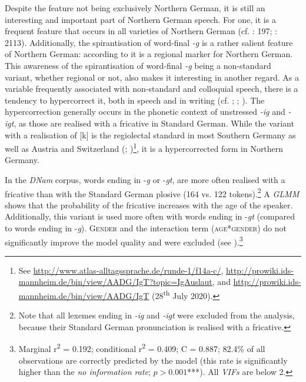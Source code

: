 \documentclass[output=paper]{langsci/langscibook}
\begin{document}
Despite the feature not being exclusively Northern German, it is still an interesting and important part of Northern German speech. For one, it is a frequent feature that occurs in all varieties of Northern German (cf. \citealt{lauf_regional_1996}: 197; \citealt{mihm_sprachgeschichte_2000}: 2113). Additionally, the spirantisation of word-final \textit{-g} is a rather salient feature of Northern German: according to \citet[159]{berend_standard_2008} it is a regional marker for Northern German. This awareness of the spirantisation of word-final \textit{-g} being a non-standard variant, whether regional or not, also makes it interesting in another regard. As a variable frequently associated with non-standard and colloquial speech, there is a tendency to hypercorrect it, both in speech and in writing (cf. \citealt{rosenberg_berliner_1986}; \citealt{martens_niederdeutsch-bedingte_1988}; \citealt{eichinger_deutsche_2007}). The hypercorrection generally occurs in the phonetic context of unstressed \textit{-ig} and \textit{-igt}, as those are realised with a fricative in Standard German. While the variant with a realisation of [k] is the regiolectal standard in most Southern Germany as well as Austria and Switzerland (\citealt{elspas_atlas_2003}; \citealt{kleiner_atlas_2011})\footnote{See \url{http://www.atlas-alltagssprache.de/runde-1/f14a-c/}, \url{http://prowiki.ids-mannheim.de/bin/view/AADG/IgT?topic=IgAuslaut}, and \url{http://prowiki.ids-mannheim.de/bin/view/AADG/IgT} (28\textsuperscript{th} July 2020).}, it is a hypercorrected form in Northern Germany. 

In the \textit{DNam} corpus, words ending in \nobreakdash-\textit{g} or -\textit{gt}, are more often realised with a fricative than with the Standard German plosive (164 vs. 122 tokens).\footnote{Note that all lexemes ending in \textit{-ig} and \textit{-igt} were excluded from the analysis, because their Standard German pronunciation is realised with a fricative.} A \textit{GLMM} shows that the probability of the fricative increases with the age of the speaker. Additionally, this variant is used more often with words ending in -\textit{gt} (compared to words ending in -\textit{g}). \textsc{Gender} and the interaction term (\textsc{age*gender}) do not significantly improve the model quality and were excluded (see ).\footnote{Marginal r\textsuperscript{2} = 0.192; conditional r\textsuperscript{2} = 0.409; C = 0.887; 82.4\% of all observations are correctly predicted by the model (this rate is significantly higher than the \textit{no information rate}; $p > 0.001$***). All \textit{VIFs} are below 2.}
\end{document}
